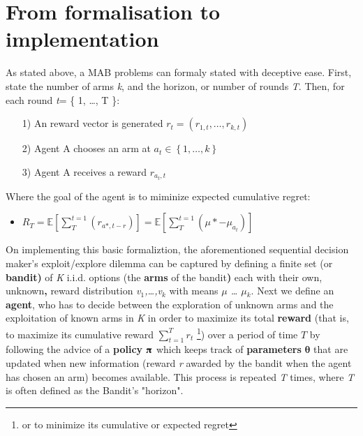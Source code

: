 \documentclass[nojss]{jss}\usepackage[]{graphicx}\usepackage[]{color}
\begin{document}
\section{From formalisation to implementation}

As stated above, a MAB problems can formaly stated with deceptive ease. First, state the number of arms \emph{k}, and the horizon, or number of rounds \emph{T}. Then, for each round \emph{t}= \{ 1, \ldots, T \}:

\begin{enumerate}
         \item[1)] An reward vector is generated \(r_{t}=\left( r_{1,t},  \dots, r_{k,t}\right)\)
         \item[2)] Agent A chooses an arm at \(a_{t} \in \left\{ 1, \dots, k \right\}\)
         \item[3)] Agent A receives a reward \(r_{a_{t},t}\)
\end{enumerate}

Where the goal of the agent is to miminize expected cumulative regret:

\begin{itemize}
         \item \( R_{T} = \mathbb{E}\left[ \textstyle \sum_{T}^{t=1}(r_{a*,t-r}) \right] = \mathbb{E}\left[ \textstyle \sum_{T}^{t=1}(\mu*-\mu_{a_{t}}) \right] \)
\end{itemize}

On implementing this basic formaliztion, the aforementioned sequential decision maker's exploit/explore dilemma can be captured by defining a finite set (or \textbf{bandit)} of \textit{K} i.i.d. options (the \textbf{arms }of the bandit\textbf{) }each with their own, unknown\textbf{, }reward distribution \textit{v${}_{1}$,{\dots},v${}_{k}$} with means \textit{$\mu$ {\dots} $\mu$${}_{k}$}. Next we define an \textbf{agent}, who has to decide between the exploration of unknown arms and the exploitation of known arms in \textit{K} in order to maximize its total\textbf{ reward} (that is, to maximize its cumulative reward $\sum_{t=1}^T r_t$ \footnote{or to minimize its cumulative or expected regret}) over a period of time $T$ by following the advice of a \textbf{policy $\boldsymbol{\piup}$} which keeps track of \textbf{parameters} \textbf{\textit{$\boldsymbol{\theta}$}}\textit{ }that are updated when new information (reward \textit{r} awarded by the bandit when the agent has chosen an arm) becomes available. This process is repeated \textit{T} times, where \textit{T} is often defined as the Bandit's "horizon".
\end{document}
